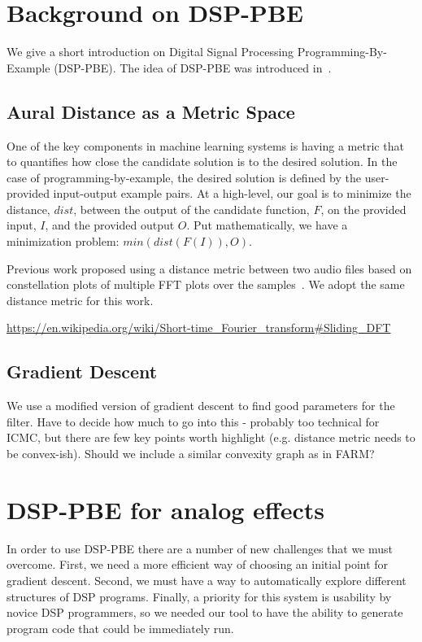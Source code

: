 \section{Background on DSP-PBE}

We give a short introduction on Digital Signal Processing Programming-By-Example (DSP-PBE).
The idea of DSP-PBE was introduced in~\cite{SantolucitoFARM}.

\subsection{Aural Distance as a Metric Space}

One of the key components in machine learning systems is having a metric that to quantifies how close the candidate solution is to the desired solution.
In the case of programming-by-example, the desired solution is defined by the user-provided input-output example pairs.
At a high-level, our goal is to minimize the distance, $dist$, between the output of the candidate function, $F$, on the provided input, $I$, and the provided output $O$.
Put mathematically, we have a minimization problem: $min (dist ( F(I)), O)$.

Previous work proposed using a distance metric between two audio files based on constellation plots of multiple FFT plots over the samples~\cite{SantolucitoFARM}.
We adopt the same distance metric for this work.

\url{https://en.wikipedia.org/wiki/Short-time_Fourier_transform#Sliding_DFT}

\subsection{Gradient Descent}

We use a modified version of gradient descent to find good parameters for the filter.
Have to decide how much to go into this - probably too technical for ICMC, but there are few key points worth highlight (e.g. distance metric needs to be convex-ish).
Should we include a similar convexity graph as in FARM? 


\section{DSP-PBE for analog effects}

In order to use DSP-PBE there are a number of new challenges that we must overcome.
First, we need a more efficient way of choosing an initial point for gradient descent. 
Second, we must have a way to automatically explore different structures of DSP programs. 
Finally, a priority for this system is usability by novice DSP programmers, so we needed our tool to have the ability to generate program code that could be immediately run.

